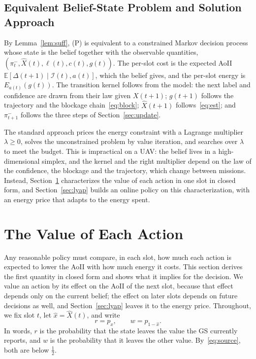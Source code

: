 \documentclass[journal]{IEEEtran}
\theoremstyle{remark}
\newcommand{\E}{\mathbb{E}}
\newcommand{\I}{\mathcal{I}}
\newcommand{\lab}{\ell}
\newcommand{\xh}{\hat{x}}
\begin{document}
\subsection{Equivalent Belief-State Problem and Solution Approach}
By Lemma~\ref{lem:suff}, (P) is equivalent to a constrained Markov decision process whose state is the belief together with the observable quantities, $(\pi^-_t,\hat X(t),\lab(t),c(t),g(t))$. The per-slot cost is the expected AoII $\E[\Delta(t+1)\mid\I(t),a(t)]$, which the belief gives, and the per-slot energy is $E_{a(t)}(g(t))$. The transition kernel follows from the model: the next label and confidence are drawn from their law given $X(t+1)$; $g(t+1)$ follows the trajectory and the blockage chain~\eqref{eq:block}; $\hat X(t+1)$ follows~\eqref{eq:est}; and $\pi^-_{t+1}$ follows the three steps of Section~\ref{sec:update}.

The standard approach prices the energy constraint with a Lagrange multiplier $\lambda\ge0$, solves the unconstrained problem by value iteration, and searches over $\lambda$ to meet the budget. This is impractical on a UAV: the belief lives in a high-dimensional simplex, and the kernel and the right multiplier depend on the law of the confidence, the blockage and the trajectory, which change between missions. Instead, Section~\ref{sec:structure} characterizes the value of each action in one slot in closed form, and Section~\ref{sec:lyap} builds an online policy on this characterization, with an energy price that adapts to the energy spent.
\section{The Value of Each Action}\label{sec:structure}
Any reasonable policy must compare, in each slot, how much each action is expected to lower the AoII with how much energy it costs. This section derives the first quantity in closed form and shows what it implies for the decision. We value an action by its effect on the AoII of the next slot, because that effect depends only on the current belief; the effect on later slots depends on future decisions as well, and Section~\ref{sec:lyap} leaves it to the energy price. Throughout, we fix slot $t$, let $\xh=\hat X(t)$, and write
\begin{equation}\label{eq:rw}
r=p_{\xh},\qquad w=p_{1-\xh}.
\end{equation}
In words, $r$ is the probability that the state leaves the value the GS currently reports, and $w$ is the probability that it leaves the other value. By~\eqref{eq:source}, both are below $\frac12$.
\end{document}
